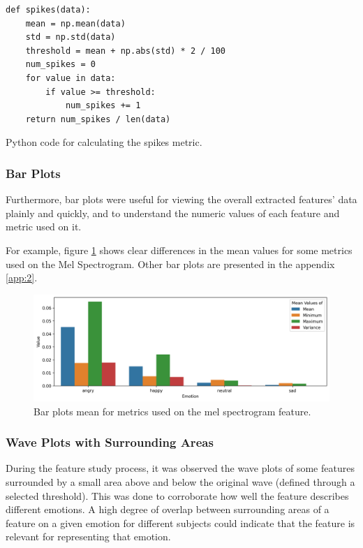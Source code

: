 \begin{listing}[H]
	\begin{verbatim}
def spikes(data):
	mean = np.mean(data)
	std = np.std(data)
	threshold = mean + np.abs(std) * 2 / 100
	num_spikes = 0
	for value in data:
		if value >= threshold:
			num_spikes += 1
	return num_spikes / len(data)
	\end{verbatim}
	\caption{Python code for calculating the spikes metric.}
	\label{spikes:code}
\end{listing}



\subsubsection{Bar Plots}

Furthermore, bar plots were useful for viewing the overall extracted features' data plainly and quickly, and to understand the numeric values of each feature and metric used on it.

For example, figure \ref{fig:melBarPlot} shows clear differences in the mean values for some metrics used on the Mel Spectrogram. Other bar plots are presented in the appendix \ref{app:2}.

\begin{figure}[H]
	\centering
	\includegraphics[width=\textwidth]{figs/4_1_traditional/meanFeatBarPlot.png}
	\caption{Bar plots mean for metrics used on the mel spectrogram feature.}
	\label{fig:melBarPlot}
\end{figure}


\subsubsection{Wave Plots with Surrounding Areas}

During the feature study process, it was observed the wave plots of some features surrounded by a small area above and below the original wave (defined through a selected threshold). This was done to corroborate how well the feature describes different emotions. A high degree of overlap between surrounding areas of a feature on a given emotion for different subjects could indicate that the feature is relevant for representing that emotion.

